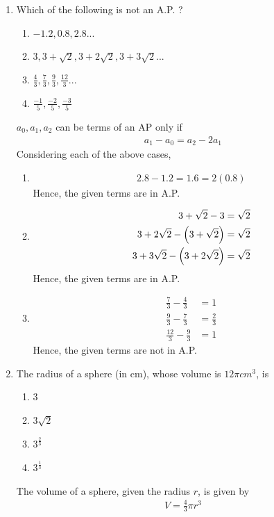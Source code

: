 \documentclass[journal,12pt,twocolumn]{IEEEtran}
\begin{document}
\begin{enumerate}[label=1.\arabic*]
\item Which of the following is not an A.P. ?
\begin{enumerate}
    \item $-1.2, 0.8, 2.8...$
    \item $3, 3 + \sqrt{2}, 3 + 2\sqrt{2},3 + 3\sqrt{2}...$
    \item $\frac{4}{3}, \frac{7}{3}, \frac{9}{3}, \frac{12}{3}...$
    \item $\frac{-1}{5}, \frac{-2}{5}, \frac{-3}{5}$
\end{enumerate}
\solution $a_0, a_1, a_2$ can be terms of an AP only if 
		\begin{align}
	a_1 - 	a_0 = a_2 - 2a_1
		\end{align}
		Considering each of the above cases, 
		\begin{enumerate}
			\item 
				\begin{align}
					2.8 - 1.2 = 1.6 = 2(0.8)
				\end{align}
				Hence, the given terms are in A.P.
			\item 
				\begin{align}
					3 + \sqrt{2} - 3 = \sqrt{2} \\
					3 + 2\sqrt{2} - \left(3+ \sqrt{2}\right)= \sqrt{2} \\
					3 + 3\sqrt{2} - \left(3+ 2\sqrt{2}\right)= \sqrt{2} 
				\end{align}
				Hence, the given terms are in A.P.
    \item 
	    \begin{align}
		    \frac{7}{3} -   \frac{4}{3} &= 1
		    \\
		     \frac{9}{3}-\frac{7}{3} &= \frac{2}{3}
		     \\
		    \frac{12}{3}-\frac{9}{3} &= 1
	    \end{align}
				Hence, the given terms are not in A.P.
				\end{enumerate}

\item The radius of a sphere (in cm), whose volume is $12\pi cm^3$, is
\begin{enumerate}
    \item $3$
    \item $3 \sqrt{2}$
    \item $3^\frac{2}{3}$
    \item $3^\frac{1}{3}$
\end{enumerate}
\solution 
The volume of a sphere, given the radius $r$, is given by
\begin{align}
	V = \frac{4}{3}\pi r^3
\end{align}


\end{enumerate}
\end{document}
